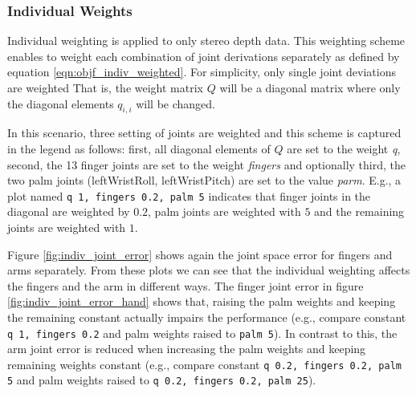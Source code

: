 \subsubsection{Individual Weights}

Individual weighting is applied to only stereo depth data. This weighting scheme enables to weight each combination of joint derivations separately as defined by equation \ref{eqn:objf_indiv_weighted}. For simplicity, only single joint deviations are weighted That is, the weight matrix $Q$ will be a diagonal matrix where only the diagonal elements $q_{i,i}$ will be changed.

In this scenario, three setting of joints are weighted and this scheme is captured in the legend as follows: first, all diagonal elements of $Q$ are set to the weight \emph{q}, second, the 13 finger joints are set to the weight \emph{fingers} and optionally third, the two palm joints (leftWristRoll, leftWristPitch) are set to the value \emph{parm}. E.g., a plot named \texttt{q 1, fingers 0.2, palm 5} indicates that finger joints in the diagonal are weighted by $0.2$, palm joints are weighted with $5$ and the remaining joints are weighted with $1$.

Figure \ref{fig:indiv_joint_error} shows again the joint space error for fingers and arms separately. From these plots we can see that the individual weighting affects the fingers and the arm in different ways. The finger joint error in figure \ref{fig:indiv_joint_error_hand} shows that, raising the palm weights and keeping the remaining constant actually impairs the performance (e.g., compare constant \texttt{q 1, fingers 0.2} and palm weights raised to \texttt{palm 5}). In contrast to this, the arm joint error is reduced when increasing the palm weights and keeping remaining weights constant (e.g., compare constant \texttt{q 0.2, fingers 0.2, palm 5} and palm weights raised to \texttt{q 0.2, fingers 0.2, palm 25}).

